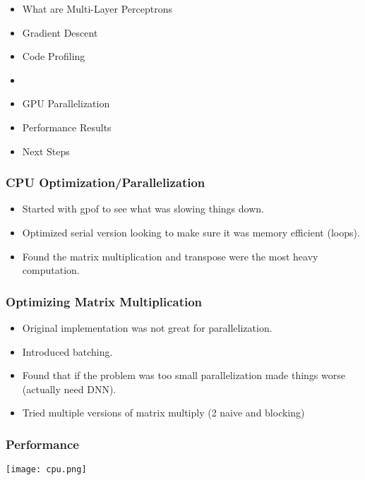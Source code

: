 \begin{frame}
\begin{itemize}
    \item What are Multi-Layer Perceptrons
    \item Gradient Descent
    \item Code Profiling
    \item \textbf{\color{red}{CPU Parallelization}}
    \item GPU Parallelization
    \item Performance Results 
    \item Next Steps
\end{itemize}
\end{frame}

\begin{frame}
    \frametitle{CPU Optimization/Parallelization}
    \begin{itemize}
        \item Started with gpof to see what was slowing things down.
        \item Optimized serial version looking to make sure it was memory
            efficient (loops). 
        \item Found the matrix multiplication and transpose were the most heavy
            computation.
    \end{itemize}
\end{frame}

\begin{frame}
    \frametitle{Optimizing Matrix Multiplication}
    \begin{itemize}
        \item Original implementation was not great for parallelization.
        \item Introduced batching.
        \item Found that if the problem was too small parallelization made
            things worse (actually need DNN).
        \item Tried multiple versions of matrix multiply (2 naive and blocking)
    \end{itemize}
\end{frame}

\begin{frame}
    \frametitle{Performance}
    \texttt{[image: cpu.png]}
\end{frame}




